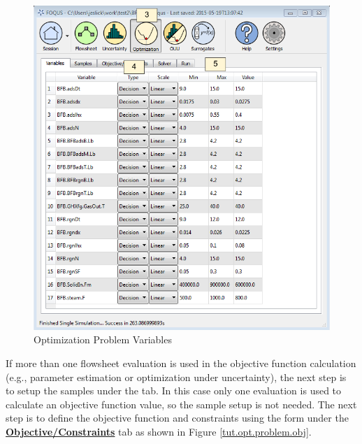 \begin{figure}[H] 
	\begin{center}
		\includegraphics[scale=0.55]{Chapt_optimization/figs/optProblemVar}
		\caption{Optimization Problem Variables}
		\label{tut.opt.problem.vars}
	\end{center}
\end{figure}

If more than one flowsheet evaluation is used in the objective function calculation (e.g., parameter estimation or optimization under uncertainty), the next step is to setup the samples under the  tab. In this case only one evaluation is used to calculate an objective function value, so the sample setup is not needed. The next step is to define the objective function and constraints using the form under the \textbf{\underline{Objective/Constraints}} tab as shown in Figure \ref{tut.opt.problem.obj}.

